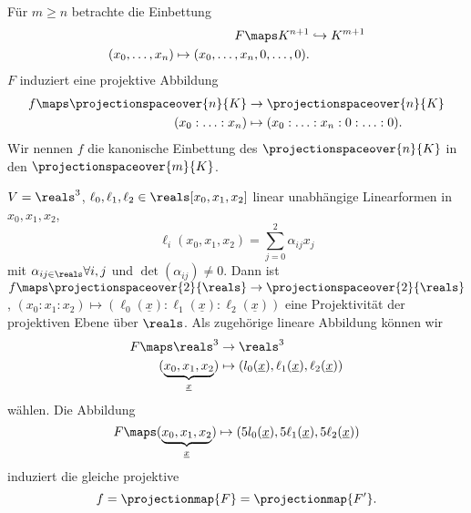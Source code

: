 \begin{beispiel*}
  Für \( m\geq n \) betrachte die Einbettung
  \begin{equation*}
    \begin{split}
      F\maps K^{n+1}&\hookrightarrow K^{m+1}\\
      (x_0,\dotsc,x_n)\mapsto (x_0,\dotsc,x_n,0,\dotsc,0).
    \end{split}
  \end{equation*}
  \( F \) induziert eine projektive Abbildung
  \begin{equation*}
    \begin{split}
      f\maps \projectionspaceover{n}{K}&\to \projectionspaceover{n}{K}\\
      (x_0:\dotsc:x_n)&\mapsto(x_0:\dotsc:x_n:0:\dotsc:0).
    \end{split}
  \end{equation*}
  Wir nennen \( f \) die kanonische Einbettung des \( \projectionspaceover{n}{K} \) in den \( \projectionspaceover{m}{K} \).

  \( V=\reals^3 \), \( \ell_0, \ell_1, \ell_2\in \reals[x_0,x_1,x_2] \) linear unabhängige Linearformen in \( x_0,x_1,x_2 \), \dh
  \begin{equation*}
    \ell_i(x_0,x_1,x_2)=\sum_{j=0}^{2}\alpha_{ij}x_j
  \end{equation*}
  mit \( \alpha_{ij\in \reals} \forall i,j\) und \( \det(\alpha_{ij})\neq 0 \). Dann ist \( f\maps \projectionspaceover{2}{\reals} \to \projectionspaceover{2}{\reals}\), \( (x_0:x_1:x_2)\mapsto (\ell_0(\underline{x}):\ell_1(\underline{x}):\ell_2(\underline{x})) \) eine Projektivität der projektiven Ebene über \( \reals \). Als zugehörige lineare Abbildung können wir \zb
  \begin{equation*}
    \begin{split}
      F\maps \reals^3&\to \reals^3\\
    (\underbrace{x_0,x_1,x_2}_{\underline{x}})&\mapsto (l_0(\underline{x}),\ell_1(\underline{x}),\ell_2(\underline{x}))
    \end{split}
  \end{equation*}
  wählen. Die Abbildung
  \begin{equation*}
    F\maps(\underbrace{x_0,x_1,x_2}_{\underline{x}})\mapsto (5l_0(\underline{x}),5\ell_1(\underline{x}),5\ell_2(\underline{x}))
  \end{equation*}
  induziert die gleiche projektive 
  \begin{equation*}
    f=\projectionmap{F}=\projectionmap{F'}.
  \end{equation*}
\end{beispiel*}
